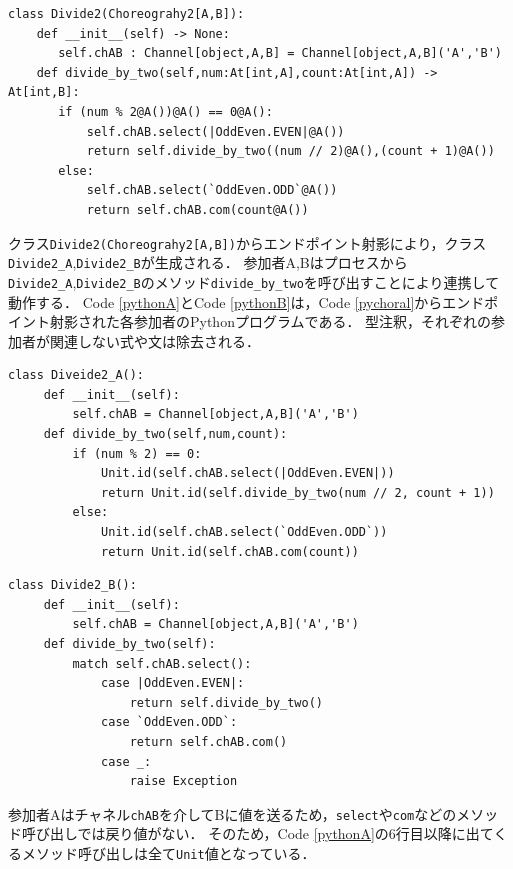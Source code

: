 \documentclass{thesis}
\begin{document}
\begin{lstlisting}[caption = 参加者\texttt{A,B}のコレオグラフィ,label=pychoral]
 class Divide2(Choreograhy2[A,B]):
    def __init__(self) -> None:
       self.chAB : Channel[object,A,B] = Channel[object,A,B]('A','B')
    def divide_by_two(self,num:At[int,A],count:At[int,A]) -> At[int,B]:
       if (num % 2@A())@A() == 0@A():
           self.chAB.select(|OddEven.EVEN|@A())
           return self.divide_by_two((num // 2)@A(),(count + 1)@A())
       else:
           self.chAB.select(`OddEven.ODD`@A())
           return self.chAB.com(count@A())
\end{lstlisting}

クラス\texttt{Divide2(Choreograhy2[A,B])}からエンドポイント射影により，クラス\texttt{Divide2\_A},\texttt{Divide2\_B}が生成される．
参加者A,Bはプロセスから\texttt{Divide2\_A},\texttt{Divide2\_B}のメソッド\texttt{divide\_by\_two}を呼び出すことにより連携して動作する．
Code \ref{pythonA}とCode \ref{pythonB}は，Code \ref{pychoral}からエンドポイント射影された各参加者のPythonプログラムである．
型注釈，それぞれの参加者が関連しない式や文は除去される．
\begin{lstlisting}[caption = 参加者APythonプログラム, label = pythonA]
 class Diveide2_A():
     def __init__(self):
         self.chAB = Channel[object,A,B]('A','B')
     def divide_by_two(self,num,count):
         if (num % 2) == 0:
             Unit.id(self.chAB.select(|OddEven.EVEN|))
             return Unit.id(self.divide_by_two(num // 2, count + 1))
         else:
             Unit.id(self.chAB.select(`OddEven.ODD`))
             return Unit.id(self.chAB.com(count))
 \end{lstlisting}
 
 \begin{lstlisting}[caption = 参加者BのPythonプログラム, label = pythonB]
 class Divide2_B():
     def __init__(self):
         self.chAB = Channel[object,A,B]('A','B')
     def divide_by_two(self):
         match self.chAB.select():
             case |OddEven.EVEN|:
                 return self.divide_by_two()
             case `OddEven.ODD`:
                 return self.chAB.com()
             case _:
                 raise Exception
\end{lstlisting}

参加者Aはチャネル\texttt{chAB}を介してBに値を送るため，\texttt{select}や\texttt{com}などのメソッド呼び出しでは戻り値がない．
そのため，Code \ref{pythonA}の6行目以降に出てくるメソッド呼び出しは全て\texttt{Unit}値となっている．
\end{document}
